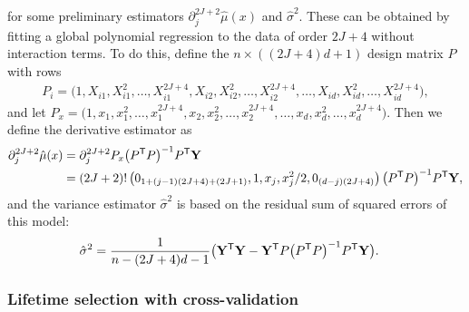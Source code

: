 %
for some preliminary estimators
$\partial^{2 J + 2}_j \hat\mu(x)$ and $\hat\sigma^2$.
These can be obtained by fitting a global polynomial regression
to the data of order $2 J + 4$ without interaction terms.
To do this, define the $n \times ((2 J + 4)d + 1)$ design matrix $P$ with rows
%
\begin{align*}
  P_i = \big(
    1, X_{i1}, X_{i1}^2, \ldots, X_{i1}^{2 J + 4},
    X_{i2}, X_{i2}^2, \ldots, X_{i2}^{2 J + 4},
    \ldots,
    X_{id}, X_{id}^2, \ldots, X_{id}^{2 J + 4}
  \big),
\end{align*}
%
and let
%
$P_x = \big(
  1, x_{1}, x_{1}^2, \ldots, x_{1}^{2 J + 4},
  x_{2}, x_{2}^2, \ldots, x_{2}^{2 J + 4},
  \ldots,
  x_{d}, x_{d}^2, \ldots, x_{d}^{2 J + 4}
\big).
$
%
Then we define the derivative estimator as
%
\begin{align*}
  \partial^{2 J + 2}_j \hat\mu(x)
  &=
  \partial^{2 J + 2}_j P_x
  \big( P^{\mathsf{T}} P \big)^{-1}
  P^{\mathsf{T}} \mathbf{Y} \\
  &=
  (2J + 2)!
  \left(
    0_{1 + (j-1)(2 J + 4) + (2J + 1)},
    1, x_j, x_j^2 / 2,
    0_{(d-j)(2 J + 4)}
  \right)
  \big( P^{\mathsf{T}} P \big)^{-1}
  P^{\mathsf{T}} \mathbf{Y},
\end{align*}
%
and the variance estimator $\hat\sigma^2$ is
based on the residual sum of squared errors of this model:
%
\begin{align*}
  \hat\sigma^2
  &=
  \frac{1}{n - (2J + 4)d - 1}
  \big(
    \mathbf{Y}^{\mathsf{T}} \mathbf{Y}
    - \mathbf{Y}^{\mathsf{T}} P \big( P^{\mathsf{T}} P \big)^{-1} P^{\mathsf{T}} \mathbf{Y}
  \big).
\end{align*}

\subsubsection*{Lifetime selection with cross-validation}

